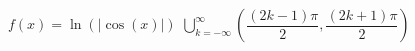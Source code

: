 { $f(x) = \ln\left( |\cos(x)| \right)$}
{ $\displaystyle \bigcup_{k=-\infty}^{\infty} \left( \dfrac{(2k - 1)\pi}{2}, \dfrac{(2k+1)\pi}{2} \right)$}
